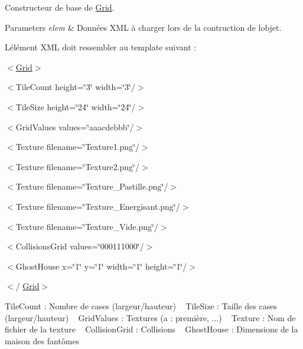 Constructeur de base de \hyperlink{class_grid}{Grid}. 


\begin{DoxyParams}{Parameters}
{\em elem} & Données X\+M\+L à charger lors de la contruction de l\textquotesingle{}objet.\\
\hline
\end{DoxyParams}
L\textquotesingle{}élément X\+M\+L doit ressembler au template suivant \+:
\begin{DoxyItemize}
\item $<$\hyperlink{class_grid}{Grid}$>$
\begin{DoxyItemize}
\item $<$Tile\+Count height=\char`\"{}3\char`\"{} width=\char`\"{}3\char`\"{}/$>$
\item $<$Tile\+Size height=\char`\"{}24\char`\"{} width=\char`\"{}24\char`\"{}/$>$
\item $<$Grid\+Values values=\char`\"{}aaacdebbb\char`\"{}/$>$
\item $<$Texture filename=\char`\"{}\+Texture1.\+png\char`\"{}/$>$
\item $<$Texture filename=\char`\"{}\+Texture2.\+png\char`\"{}/$>$
\item $<$Texture filename=\char`\"{}\+Texture\+\_\+\+Pastille.\+png\char`\"{}/$>$
\item $<$Texture filename=\char`\"{}\+Texture\+\_\+\+Energisant.\+png\char`\"{}/$>$
\item $<$Texture filename=\char`\"{}\+Texture\+\_\+\+Vide.\+png\char`\"{}/$>$
\item $<$Collisions\+Grid values=\char`\"{}000111000\char`\"{}/$>$
\item $<$Ghost\+House x=\char`\"{}1\char`\"{} y=\char`\"{}1\char`\"{} width=\char`\"{}1\char`\"{} height=\char`\"{}1\char`\"{}/$>$
\end{DoxyItemize}
\item $<$/ \hyperlink{class_grid}{Grid}$>$
\end{DoxyItemize}

Tile\+Count \+: Nombre de cases (largeur/hauteur) ~\newline
 Tile\+Size \+: Taille des cases (largeur/hauteur) ~\newline
 Grid\+Values \+: Textures (a \+: première, ...) ~\newline
 Texture \+: Nom de fichier de la texture ~\newline
 Collision\+Grid \+: Collisions ~\newline
 Ghost\+House \+: Dimensions de la maison des fantômes 

